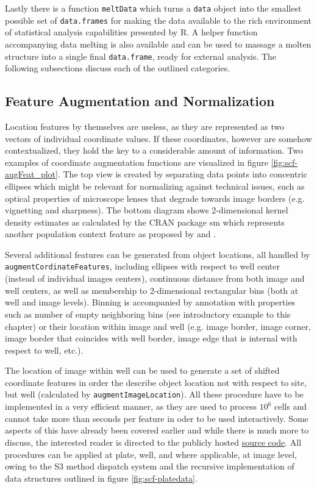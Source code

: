 Lastly there is a function \texttt{meltData} which turns a \texttt{data} object into the smallest possible set of \texttt{data.frames} for making the data available to the rich environment of statistical analysis capabilities presented by R. A helper function accompanying data melting is also available and can be used to massage a molten structure into a single final \texttt{data.frame}, ready for external analysis. The following subsections discuss each of the outlined categories.



\subsection{Feature Augmentation and Normalization}
\label{sec:scf-aug-norm}
Location features by themselves are useless, as they are represented as two vectors of individual coordinate values. If these coordinates, however are somehow contextualized, they hold the key to a considerable amount of information. Two examples of coordinate augmentation functions are visualized in figure \ref{fig:scf-augFeat_plot}. The top view is created by separating data points into concentric ellipses which might be relevant for normalizing against technical issues, such as optical properties of microscope lenses that degrade towards image borders (e.g. vignetting and sharpness). The bottom diagram shows 2-dimensional kernel density estimates as calculated by the CRAN package sm \citep{Bowman2014} which represents another population context feature as proposed by \cite{Knapp2011} and \cite{Snijder2012}.

Several additional features can be generated from object locations, all handled by \texttt{augmentCordinateFeatures}, including ellipses with respect to well center (instead of individual images centers), continuous distance from both image and well centers, as well as membership to 2-dimensional rectangular bins (both at well and image levels). Binning is accompanied by annotation with properties such as number of empty neighboring bins (see introductory example to this chapter) or their location within image and well (e.g. image border, image corner, image border that coincides with well border, image edge that is internal with respect to well, etc.).

The location of image within well can be used to generate a set of shifted coordinate features in order the describe object location not with respect to site, but well (calculated by \texttt{augmentImageLocation}). All these procedure have to be implemented in a very efficient manner, as they are used to process \tilde $10^6$ cells and cannot take more than seconds per feature in oder to be used interactively. Some aspects of this have already been covered earlier and while there is much more to discuss, the interested reader is directed to the publicly hosted \href{https://github.com/nbenn/singleCellFeatures}{source code}. All procedures can be applied at plate, well, and where applicable, at image level, owing to the S3 method dispatch system and the recursive implementation of data structures outlined in figure \ref{fig:scf-platedata}.

